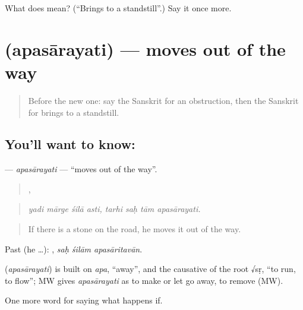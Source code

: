 \begin{tcolorbox}[breakable,colback=teal!4,colframe=teal!35!black,title={Before you move on}]
What does  mean? (\textquotedblleft{}Brings to a standstill\textquotedblright{}.) Say it once more.
\end{tcolorbox}
\section[\texorpdfstring{\sk{अपसारयति} (apasārayati)}{अपसारयति (apasārayati)}]{ (apasārayati) — moves out of the way}

\label{lesson:SA-C533-apasarayati}



\begin{quote}
Before the new one: say the Sanskrit for an obstruction, then the Sanskrit for brings to a standstill.
\end{quote}

\subsection*{You'll want to know: }
\textbf{} — \emph{apasārayati} — \textquotedblleft{}moves out of the way\textquotedblright{}.

\begin{quote}
   ,    
\end{quote}

\begin{quote}
\emph{yadi mārge śilā asti, tarhi saḥ tām apasārayati.}
\end{quote}

\begin{quote}
If there is a stone on the road, he moves it out of the way.
\end{quote}

Past (he …):   , \emph{saḥ śilām apasāritavān}.

\begin{cousinweb}
\textbf{} (\emph{apasārayati}) is built on \emph{apa}, \textquotedblleft{}away\textquotedblright{}, and the causative of the root √sṛ, \textquotedblleft{}to run, to flow\textquotedblright{}; MW gives \emph{apasārayati} as to make or let go away, to remove (MW).
\end{cousinweb}

\begin{grammarlens}[title={What you've built}]
One more word for saying what happens if.
\end{grammarlens}

